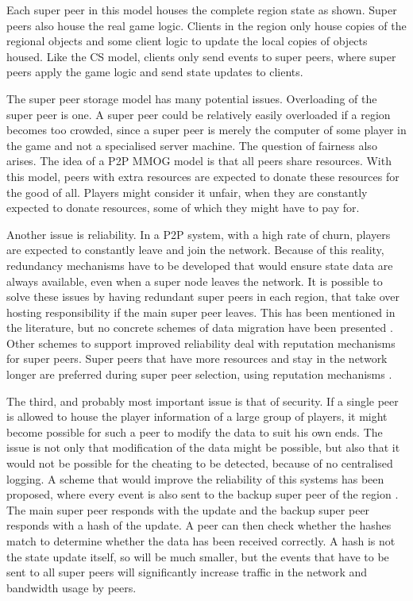 \documentclass[journal,oneside,a4paper,onecolumn]{IEEEtran}
\begin{document}
Each super peer in this model houses the complete region state as shown. Super peers also house the real game logic. Clients in the region only house copies of the regional objects and some client logic to update the local copies of objects housed. Like the \ac{CS} model, clients only send events to super peers, where super peers apply the game logic and send state updates to clients.

The super peer storage model has many potential issues. Overloading of the super peer is one. A super peer could be relatively easily overloaded if a region becomes too crowded, since a super peer is merely the computer of some player in the game and not a specialised server machine. The question of fairness also arises. The idea of a P2P MMOG model is that all peers share resources. With this model, peers with extra resources are expected to donate these resources for the good of all. Players might consider it unfair, when they are constantly expected to donate resources, some of which they might have to pay for.

Another issue is reliability. In a P2P system, with a high rate of churn, players are expected to constantly leave and join the network. Because of this reality, redundancy mechanisms have to be developed that would ensure state data are always available, even when a super node leaves the network. It is possible to solve these issues by having redundant super peers in each region, that take over hosting responsibility if the main super peer leaves. This has been mentioned in the literature, but no concrete schemes of data migration have been presented \cite{}. Other schemes to support improved reliability deal with reputation mechanisms for super peers. Super peers that have more resources and stay in the network longer are preferred during super peer selection, using reputation mechanisms \cite{fan_mediator_paper}.

The third, and probably most important issue is that of security. If a single peer is allowed to house the player information of a large group of players, it might become possible for such a peer to modify the data to suit his own ends. The issue is not only that modification of the data might be possible, but also that it would not be possible for the cheating to be detected, because of no centralised logging. A scheme that would improve the reliability of this systems has been proposed, where every event is also sent to the backup super peer of the region \cite{past_storage_focus}. The main super peer responds with the update and the backup super peer responds with a hash of the update. A peer can then check whether the hashes match to determine whether the data has been received correctly. A hash is not the state update itself, so will be much smaller, but the events that have to be sent to all super peers will significantly increase traffic in the network and bandwidth usage by peers.
\end{document}
